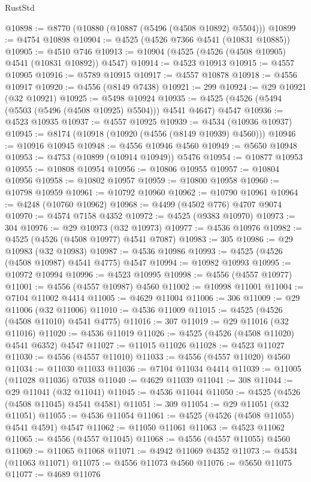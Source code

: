 \begin{lexlean}{RustStd}
\begin{coremodule}
@10898 := @8770 (@10880 (@10887 (@5496 (@4508 @10892) @5504)))
@10899 := @4754 @10898
@10904 := @4525 (@4526 @7366 @4541 (@10831 @10885))
@10905 := @4510 @746
@10913 := @10904 (@4525 (@4526 (@4508 @10905) @4541 (@10831 @10892)) @4547)
@10914 := @4523 @10913
@10915 := @4557 @10905
@10916 := @5789 @10915
@10917 := @4557 @10878
@10918 := @4556 @10917
@10920 := @4556 (@8149 @7438)
@10921 := 299
@10924 := @29 @10921 (@32 @10921)
@10925 := @5498 @10924
@10935 := @4525 (@4526 (@5494 (@5503 (@5496 (@4508 @10925) @5504))) @4541 @4647) @4547
@10936 := @4523 @10935
@10937 := @4557 @10925
@10939 := @4534 (@10936 @10937)
@10945 := @8174 (@10918 (@10920 (@4556 (@8149 @10939) @4560)))
@10946 := @10916 @10945
@10948 := @4556 @10946 @4560
@10949 := @5650 @10948
@10953 := @4753 (@10899 (@10914 @10949)) @5476
@10954 := @10877 @10953
@10955 := @10808 @10954
@10956 := @10806 @10955
@10957 := @10804 @10956
@10958 := @10802 @10957
@10959 := @10800 @10958
@10960 := @10798 @10959
@10961 := @10792 @10960
@10962 := @10790 @10961
@10964 := @4248 (@10760 @10962)
@10968 := @4499 (@4502 @776) @4707 @9074
@10970 := @4574 @7158 @4352
@10972 := @4525 (@9383 @10970)
@10973 := 304
@10976 := @29 @10973 (@32 @10973)
@10977 := @4536 @10976
@10982 := @4525 (@4526 (@4508 @10977) @4541 @7087)
@10983 := 305
@10986 := @29 @10983 (@32 @10983)
@10987 := @4536 @10986
@10993 := @4525 (@4526 (@4508 @10987) @4541 @4775) @4547
@10994 := @10982 @10993
@10995 := @10972 @10994
@10996 := @4523 @10995
@10998 := @4556 (@4557 @10977)
@11001 := @4556 (@4557 @10987) @4560
@11002 := @10998 @11001
@11004 := @7104 @11002 @4414
@11005 := @4629 @11004
@11006 := 306
@11009 := @29 @11006 (@32 @11006)
@11010 := @4536 @11009
@11015 := @4525 (@4526 (@4508 @11010) @4541 @4775)
@11016 := 307
@11019 := @29 @11016 (@32 @11016)
@11020 := @4536 @11019
@11026 := @4525 (@4526 (@4508 @11020) @4541 @6352) @4547
@11027 := @11015 @11026
@11028 := @4523 @11027
@11030 := @4556 (@4557 @11010)
@11033 := @4556 (@4557 @11020) @4560
@11034 := @11030 @11033
@11036 := @7104 @11034 @4414
@11039 := @11005 (@11028 @11036) @7038
@11040 := @4629 @11039
@11041 := 308
@11044 := @29 @11041 (@32 @11041)
@11045 := @4536 @11044
@11050 := @4525 (@4526 (@4508 @11045) @4541 @4581)
@11051 := 309
@11054 := @29 @11051 (@32 @11051)
@11055 := @4536 @11054
@11061 := @4525 (@4526 (@4508 @11055) @4541 @4591) @4547
@11062 := @11050 @11061
@11063 := @4523 @11062
@11065 := @4556 (@4557 @11045)
@11068 := @4556 (@4557 @11055) @4560
@11069 := @11065 @11068
@11071 := @4942 @11069 @4352
@11073 := @4534 (@11063 @11071)
@11075 := @4556 @11073 @4560
@11076 := @5650 @11075
@11077 := @4689 @11076

\end{coremodule}
\end{lexlean}

